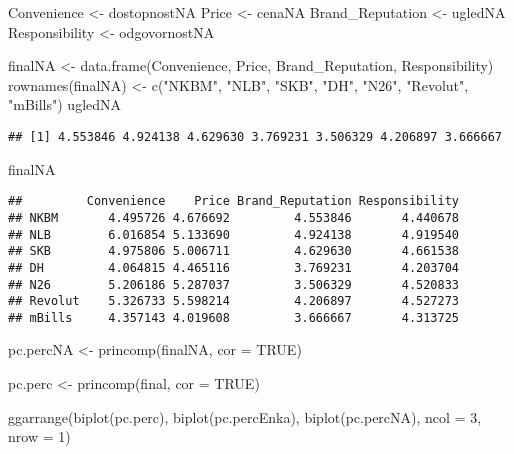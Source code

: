 \documentclass[
]{article}
\newenvironment{Shaded}{\begin{snugshade}}{\end{snugshade}}
\newcommand{\AttributeTok}[1]{\textcolor[rgb]{0.77,0.63,0.00}{#1}}
\newcommand{\ConstantTok}[1]{\textcolor[rgb]{0.00,0.00,0.00}{#1}}
\newcommand{\DecValTok}[1]{\textcolor[rgb]{0.00,0.00,0.81}{#1}}
\newcommand{\FunctionTok}[1]{\textcolor[rgb]{0.00,0.00,0.00}{#1}}
\newcommand{\NormalTok}[1]{#1}
\newcommand{\OtherTok}[1]{\textcolor[rgb]{0.56,0.35,0.01}{#1}}
\newcommand{\StringTok}[1]{\textcolor[rgb]{0.31,0.60,0.02}{#1}}
\begin{document}
\begin{Shaded}
\begin{Highlighting}[]
\NormalTok{Convenience }\OtherTok{\textless{}{-}}\NormalTok{ dostopnostNA}
\NormalTok{Price }\OtherTok{\textless{}{-}}\NormalTok{ cenaNA}
\NormalTok{Brand\_Reputation }\OtherTok{\textless{}{-}}\NormalTok{ ugledNA}
\NormalTok{Responsibility }\OtherTok{\textless{}{-}}\NormalTok{ odgovornostNA}

\NormalTok{finalNA }\OtherTok{\textless{}{-}} \FunctionTok{data.frame}\NormalTok{(Convenience, Price, Brand\_Reputation, Responsibility)}
\FunctionTok{rownames}\NormalTok{(finalNA) }\OtherTok{\textless{}{-}} \FunctionTok{c}\NormalTok{(}\StringTok{"NKBM"}\NormalTok{, }\StringTok{"NLB"}\NormalTok{, }\StringTok{"SKB"}\NormalTok{, }\StringTok{"DH"}\NormalTok{, }\StringTok{"N26"}\NormalTok{, }\StringTok{"Revolut"}\NormalTok{, }\StringTok{"mBills"}\NormalTok{)}
\NormalTok{ugledNA}
\end{Highlighting}
\end{Shaded}

\begin{verbatim}
## [1] 4.553846 4.924138 4.629630 3.769231 3.506329 4.206897 3.666667
\end{verbatim}

\begin{Shaded}
\begin{Highlighting}[]
\NormalTok{finalNA}
\end{Highlighting}
\end{Shaded}

\begin{verbatim}
##         Convenience    Price Brand_Reputation Responsibility
## NKBM       4.495726 4.676692         4.553846       4.440678
## NLB        6.016854 5.133690         4.924138       4.919540
## SKB        4.975806 5.006711         4.629630       4.661538
## DH         4.064815 4.465116         3.769231       4.203704
## N26        5.206186 5.287037         3.506329       4.520833
## Revolut    5.326733 5.598214         4.206897       4.527273
## mBills     4.357143 4.019608         3.666667       4.313725
\end{verbatim}

\begin{Shaded}
\begin{Highlighting}[]
\NormalTok{pc.percNA }\OtherTok{\textless{}{-}} \FunctionTok{princomp}\NormalTok{(finalNA, }\AttributeTok{cor =} \ConstantTok{TRUE}\NormalTok{)}
\end{Highlighting}
\end{Shaded}

\begin{Shaded}
\begin{Highlighting}[]
\NormalTok{pc.perc }\OtherTok{\textless{}{-}} \FunctionTok{princomp}\NormalTok{(final, }\AttributeTok{cor =} \ConstantTok{TRUE}\NormalTok{)}

\FunctionTok{ggarrange}\NormalTok{(}\FunctionTok{biplot}\NormalTok{(pc.perc), }\FunctionTok{biplot}\NormalTok{(pc.percEnka), }\FunctionTok{biplot}\NormalTok{(pc.percNA), }\AttributeTok{ncol =} \DecValTok{3}\NormalTok{, }\AttributeTok{nrow =} \DecValTok{1}\NormalTok{)}
\end{Highlighting}
\end{Shaded}
\end{document}
